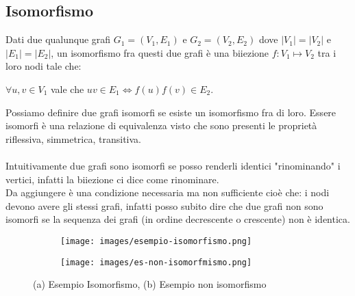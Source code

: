 \subsection{Isomorfismo}
\begin{definition}[Isomorfismo]
    Dati due qualunque grafi $G_1 = (V_1, E_1)$ e $G_2 = (V_2, E_2)$ dove $\lvert V_1\rvert = \lvert V_2\rvert$ e $\lvert E_1\rvert = \lvert E_2\rvert$, un isomorfismo fra questi due  grafi è una biiezione $f: V_1 \mapsto V_2$ tra i loro nodi tale che:
    \begin{center}
        \vspace{-5pt}
        $\forall u,v \in V_1$ vale che $uv \in E_1 \Longleftrightarrow f(u)f(v) \in E_2$.
    \end{center}
\end{definition}
\hspace{-15pt}Possiamo definire due grafi isomorfi se esiste un isomorfismo fra di loro. Essere isomorfi è una relazione di equivalenza visto che sono presenti le proprietà riflessiva, simmetrica, transitiva.\\\\
Intuitivamente due grafi sono isomorfi se posso renderli identici "rinominando" i vertici, infatti la biiezione ci dice come rinominare.\\
Da aggiungere è una condizione necessaria ma non sufficiente cioè che: i nodi devono avere gli stessi grafi, infatti posso subito dire che due grafi non sono isomorfi se la sequenza dei grafi (in ordine decrescente o crescente) non è identica.
\begin{figure}[h!]
    \vspace{-5pt}
    \centering
    \begin{subfigure}{.3\textwidth}
        \centering
        \texttt{[image: images/esempio-isomorfismo.png]}
        \vspace{-8pt}
        \caption{}
    \end{subfigure}
    \hspace{3cm}
    \begin{subfigure}{.3\textwidth}
        \centering
        \texttt{[image: images/es-non-isomorfmismo.png]}
        \vspace{-5pt}
        \caption{}
    \end{subfigure}
    \vspace{-5pt}
    \caption{(a) Esempio Isomorfismo, (b) Esempio non isomorfismo}
\end{figure}

